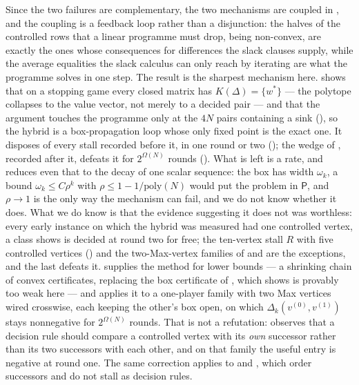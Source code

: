 \documentclass[11pt]{article}
\theoremstyle{plain}
\theoremstyle{definition}
\begin{document}
Since the two failures are complementary, the two mechanisms are coupled
in , and the coupling is a feedback loop rather than a
disjunction: the halves of the controlled rows that a linear programme
must drop, being non-convex, are exactly the ones whose consequences for
differences the slack clauses supply, while the average equalities the
slack calculus can only reach by iterating are what the programme solves
in one step. The result is the sharpest mechanism here.
 shows that on a stopping game every closed
matrix has $K(\Delta)=\{w^\ast\}$ --- the polytope collapses to the value
vector, not merely to a decided pair --- and that the argument touches the
programme only at the $4N$ pairs containing a sink
(), so the hybrid is a box-propagation loop whose
only fixed point is the exact one. It disposes of every stall recorded before it, in one round or two
(); the wedge of , recorded
after it, defeats it for $2^{\Omega(N)}$ rounds (). What is
left is a rate, and  reduces even that to the decay
of one scalar sequence: the box has width $\omega_k$, a bound
$\omega_k\le C\rho^{k}$ with $\rho\le1-1/\mathrm{poly}(N)$ would put the
problem in $\mathsf P$, and $\rho\to1$ is the only way the mechanism can
fail, and we do not know whether it does. What we do know is that the
evidence suggesting it does not was worthless: every early instance on which the hybrid was measured had one controlled
vertex, a class  shows is decided at round two
for free; the ten-vertex stall $R$ with five controlled vertices
() and the two-Max-vertex families of
 and  are the exceptions, and the
last defeats it.  supplies the method for lower
bounds --- a shrinking chain of convex certificates, replacing the box
certificate of , which 
shows is provably too weak here --- and  applies it
to a one-player family with two Max vertices wired crosswise, each keeping
the other's box open, on which $\Delta_k(v^{(0)},v^{(1)})$ stays
nonnegative for $2^{\Omega(N)}$ rounds. That is not a refutation:
 observes that a decision rule should compare a
controlled vertex with its \emph{own} successor rather than its two
successors with each other, and on that family the useful entry is
negative at round one. The same correction applies to
 and , which order
successors and do not stall as decision rules.
\end{document}
